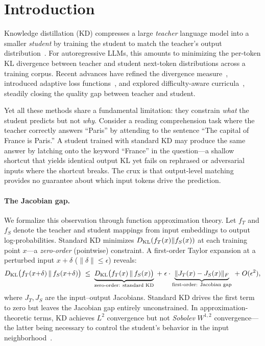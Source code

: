 
\section{Introduction}
\label{sec:intro}

Knowledge distillation (KD) compresses a large \emph{teacher} language model into a smaller \emph{student} by training the student to match the teacher's output distribution~\citep{hinton2015distilling}.
For autoregressive LLMs, this amounts to minimizing the per-token KL divergence between teacher and student next-token distributions across a training corpus.
Recent advances have refined the divergence measure~\citep{gu2024minillm, agarwal2024gkd, ko2024distillm}, introduced adaptive loss functions~\citep{wu2025akl}, and explored difficulty-aware curricula~\citep{dakd2025}, steadily closing the quality gap between teacher and student.

Yet all these methods share a fundamental limitation: they constrain \emph{what} the student predicts but not \emph{why}.
Consider a reading comprehension task where the teacher correctly answers ``Paris'' by attending to the sentence ``The capital of France is Paris.''
A student trained with standard KD may produce the same answer by latching onto the keyword ``France'' in the question---a shallow shortcut that yields identical output KL yet fails on rephrased or adversarial inputs where the shortcut breaks.
The crux is that output-level matching provides no guarantee about which input tokens drive the prediction.

\paragraph{The Jacobian gap.}
We formalize this observation through function approximation theory.
Let $f_T$ and $f_S$ denote the teacher and student mappings from input embeddings to output log-probabilities.
Standard KD minimizes $D_{\mathrm{KL}}(f_T(x) \| f_S(x))$ at each training point $x$---a \emph{zero-order} (pointwise) constraint.
A first-order Taylor expansion at a perturbed input $x + \delta$ ($\|\delta\| \leq \epsilon$) reveals:
\begin{equation}
  D_{\mathrm{KL}}\bigl(f_T(x{+}\delta) \,\|\, f_S(x{+}\delta)\bigr)
  \;\leq\;
  \underbrace{D_{\mathrm{KL}}\bigl(f_T(x) \,\|\, f_S(x)\bigr)}_{\text{zero-order: standard KD}}
  \;+\; \epsilon \cdot
  \underbrace{\|J_T(x) - J_S(x)\|_F}_{\text{first-order: Jacobian gap}}
  \;+\; O(\epsilon^2),
  \label{eq:taylor-intro}
\end{equation}
where $J_T, J_S$ are the input--output Jacobians.
Standard KD drives the first term to zero but leaves the Jacobian gap entirely unconstrained.
In approximation-theoretic terms, KD achieves $L^2$ convergence but not \emph{Sobolev} $W^{1,2}$ convergence---the latter being necessary to control the student's behavior in the input neighborhood~\citep{czarnecki2017sobolev}.

